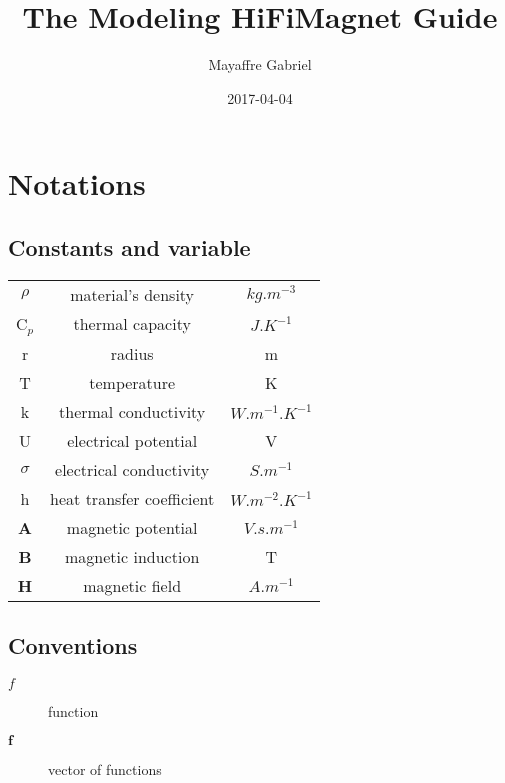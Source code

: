 \documentclass[11pt]{amsart}
\title{The Modeling HiFiMagnet Guide}
\author{Mayaffre Gabriel}
\date{2017-04-04}
\begin{document}
\maketitle
\tableofcontents
\hypertarget{x-\textbf{notations}}{\section{\textbf{Notations}}}
\hypertarget{x-constants-and-variable}{\subsection{Constants and variable}}
\begin{center}
\begin{tabular}{|c|c|c|}
\hline
$\rho$ & material’s density & $kg.m^{-3}$ \\ 
C${}_{p}$ & thermal capacity & $J.K^{-1}$ \\ 
r & radius & m \\ 
T & temperature & K \\ 
k & thermal conductivity & $W.m^{-1} .K^{-1}$ \\ 
U & electrical potential & V \\ 
$\sigma$ & electrical conductivity & $S.m^{-1}$ \\ 
h & heat transfer coefficient & $W.m^{-2} .K^{-1}$ \\ 
\textbf{A} & magnetic potential & $V.s.m^{-1}$ \\ 
\textbf{B} & magnetic induction & T \\ 
\textbf{H} & magnetic field & $A.m^{-1}$ \\ 
\hline
\end{tabular}
\end{center}

\hypertarget{x-conventions}{\subsection{Conventions}}
\begin{description}

\item[$f$]function

\item[$\textbf{f}$]vector of functions

\end{description}
\end{document}
